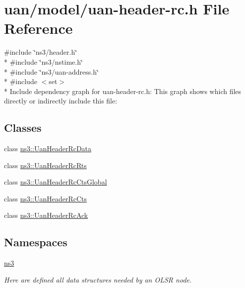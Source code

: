 \hypertarget{uan-header-rc_8h}{}\section{uan/model/uan-\/header-\/rc.h File Reference}
\label{uan-header-rc_8h}
{\ttfamily \#include \char`\"{}ns3/header.\+h\char`\"{}}\\*
{\ttfamily \#include \char`\"{}ns3/nstime.\+h\char`\"{}}\\*
{\ttfamily \#include \char`\"{}ns3/uan-\/address.\+h\char`\"{}}\\*
{\ttfamily \#include $<$set$>$}\\*
Include dependency graph for uan-\/header-\/rc.h\+:
This graph shows which files directly or indirectly include this file\+:
\subsection*{Classes}
\begin{DoxyCompactItemize}
\item 
class \hyperlink{classns3_1_1UanHeaderRcData}{ns3\+::\+Uan\+Header\+Rc\+Data}
\item 
class \hyperlink{classns3_1_1UanHeaderRcRts}{ns3\+::\+Uan\+Header\+Rc\+Rts}
\item 
class \hyperlink{classns3_1_1UanHeaderRcCtsGlobal}{ns3\+::\+Uan\+Header\+Rc\+Cts\+Global}
\item 
class \hyperlink{classns3_1_1UanHeaderRcCts}{ns3\+::\+Uan\+Header\+Rc\+Cts}
\item 
class \hyperlink{classns3_1_1UanHeaderRcAck}{ns3\+::\+Uan\+Header\+Rc\+Ack}
\end{DoxyCompactItemize}
\subsection*{Namespaces}
\begin{DoxyCompactItemize}
\item 
 \hyperlink{namespacens3}{ns3}
\begin{DoxyCompactList}\small\item\em Here are defined all data structures needed by an O\+L\+SR node. \end{DoxyCompactList}\end{DoxyCompactItemize}
